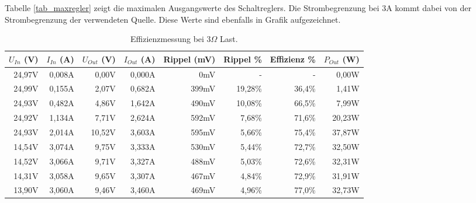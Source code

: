 Tabelle \ref{tab_maxregler} zeigt die maximalen Ausgangswerte des Schaltreglers. Die Strombegrenzung bei 3A kommt dabei von der Strombegrenzung der verwendeten Quelle. Diese Werte sind ebenfalls in Grafik  aufgezeichnet. 

\newpage

\begin{table}[h]
\centering
\begin{tabular}{|r|r|r|r|r|r|r|r|}
\hline
$U_{In}$ (V) & $I_{In}$ (A) & $U_{Out}$ (V) & $I_{Out}$ (A) & Rippel (mV) & Rippel \% & Effizienz \% & $P_{Out}$ (W) \\ \hline
24,97V   & 0,008A   & 0,00V        & 0,000A        & 0mV           & -         & -            & 0,00W      \\ \hline
24,99V   & 0,155A   & 2,07V    & 0,682A    & 399mV         & 19,28\%     & 36,4\%         & 1,41W   \\ \hline
24,93V   & 0,482A   & 4,86V    & 1,642A    & 490mV         & 10,08\%     & 66,5\%         & 7,99W   \\ \hline
24,92V   & 1,134A   & 7,71V     & 2,624A    & 592mV         & 7,68\%      & 71,6\%         & 20,23W  \\ \hline
24,93V   & 2,014A   & 10,52V    & 3,603A      & 595mV         & 5,66\%      & 75,4\%         & 37,87W  \\ \hline
14,54V   & 3,074A   & 9,75V     & 3,333A    & 530mV         & 5,44\%      & 72,7\%         & 32,50W  \\ \hline
14,52V   & 3,066A   & 9,71V     & 3,327A    & 488mV         & 5,03\%      & 72,6\%         & 32,31W  \\ \hline
14,31V   & 3,058A   & 9,65V     & 3,307A    & 467mV         & 4,84\%      & 72,9\%         & 31,91W  \\ \hline
13,90V    & 3,060A    & 9,46V     & 3,460A     & 469mV         & 4,96\%      & 77,0\%         & 32,73W  \\ \hline
\end{tabular}
\caption{Effizienzmessung bei 3$\Omega$ Last.}
\label{fig::Res3}
\end{table}

